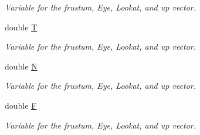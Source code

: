 \begin{DoxyCompactItemize}
\begin{DoxyCompactList}\small\item\em Variable for the frustum, Eye, Lookat, and up vector. \end{DoxyCompactList}\item 
double \hyperlink{classcft_1_1Scene_ae39672d7dbac20ac600f05d559d69805}{T}\hypertarget{classcft_1_1Scene_ae39672d7dbac20ac600f05d559d69805}{}\label{classcft_1_1Scene_ae39672d7dbac20ac600f05d559d69805}

\begin{DoxyCompactList}\small\item\em Variable for the frustum, Eye, Lookat, and up vector. \end{DoxyCompactList}\item 
double \hyperlink{classcft_1_1Scene_ae92b335cb5134ffa9df20bc441de0e32}{N}\hypertarget{classcft_1_1Scene_ae92b335cb5134ffa9df20bc441de0e32}{}\label{classcft_1_1Scene_ae92b335cb5134ffa9df20bc441de0e32}

\begin{DoxyCompactList}\small\item\em Variable for the frustum, Eye, Lookat, and up vector. \end{DoxyCompactList}\item 
double \hyperlink{classcft_1_1Scene_ab9dd8e93a0454019f2f2a2167503d075}{F}\hypertarget{classcft_1_1Scene_ab9dd8e93a0454019f2f2a2167503d075}{}\label{classcft_1_1Scene_ab9dd8e93a0454019f2f2a2167503d075}

\begin{DoxyCompactList}\small\item\em Variable for the frustum, Eye, Lookat, and up vector. \end{DoxyCompactList}\end{DoxyCompactItemize}


